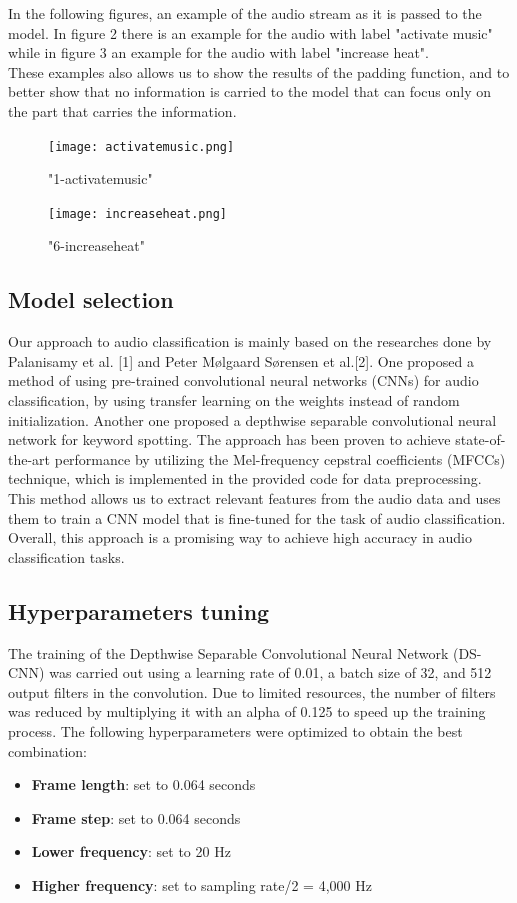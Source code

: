 \documentclass[conference]{IEEEtran}
\begin{document}
In the following figures, an example of the audio stream as it is passed to the model. In figure 2 there is an example for the audio with label "activate music" while in figure 3 an example for the audio with label "increase heat".
\\These examples also allows us to show the results of the padding function, and to better show that no information is carried to the model that can focus only on the part that carries the information.

\begin{figure}[h]
\texttt{[image: activatemusic.png]}
\caption{"1-activatemusic"}
\label{fig1}
\end{figure}

\begin{figure}[h]
\texttt{[image: increaseheat.png]}
\caption{"6-increaseheat"}
\label{fig1}
\end{figure}


\subsection{Model selection}
Our approach to audio classification is mainly based on the researches done by Palanisamy et al. [1] and Peter Mølgaard Sørensen et al.[2]. One proposed a method of using pre-trained convolutional neural networks (CNNs) for audio classification, by using transfer learning on the weights instead of random initialization. Another one proposed a depthwise separable convolutional neural network for keyword spotting. The approach has been proven to achieve state-of-the-art performance by utilizing the Mel-frequency cepstral coefficients (MFCCs) technique, which is implemented in the provided code for data preprocessing. This method allows us to extract relevant features from the audio data and uses them to train a CNN model that is fine-tuned for the task of audio classification. Overall, this approach is a promising way to achieve high accuracy in audio classification tasks.\\


\subsection{Hyperparameters tuning}
The training of the Depthwise Separable Convolutional Neural Network (DS-CNN) was carried out using a learning rate of 0.01, a batch size of 32, and 512 output filters in the convolution. Due to limited resources, the number of filters was reduced by multiplying it with an alpha of 0.125 to speed up the training process. The following hyperparameters were optimized to obtain the best combination:
\begin{itemize}
\item 	\textbf{Frame length}: set to 0.064 seconds
\item 	\textbf{Frame step}: set to 0.064 seconds
\item 	\textbf{Lower frequency}: set to 20 Hz
\item 	\textbf{Higher frequency}: set to sampling rate/2 = 4,000 Hz
\end{itemize}
\end{document}

